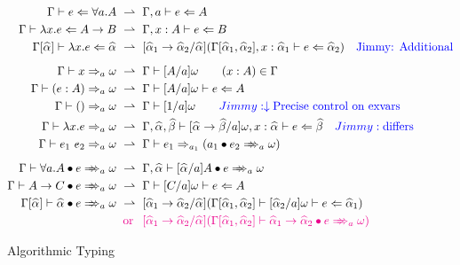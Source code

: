 \begin{figure}[t]
\begin{gather*}
\begin{aligned}
\Gm \vdash e\Lto \forall a. A &\rto \Gm,a \vdash e\Lto A\\
\Gm \vdash \lambda x. e \Lto A\to B &\rto \Gm, x:A  \vdash e \Lto B\\
\Gm[\al] \vdash \lambda x. e \Lto \al &\rto [\al[1]\to \al[2] / \al](\Gm[\al[1],\al[2]], x:\al[1] \vdash e \Lto \al[2]) \quad\text{\jimmy{Additional}}
\\[2mm]
\Gm \vdash x\To_a \jg &\rto \Gm \vdash [A/a] \jg \qquad (x:A)\in \Gm\\
\Gm \vdash (e:A)\To_a \jg &\rto \Gm \vdash [A/a]\jg \vdash e \Lto A\\
\Gm \vdash ()\To_a \jg &\rto \Gm \vdash [1/a]\jg \qquad\jimmy{\downarrow\text{Precise control on exvars}}\\
\Gm \vdash \lambda x. e \To_a \jg &\rto
	\Gm,\al,\bt \vdash [\al\to\bt/a]\jg, x:\al \vdash e\Lto \bt \quad\jimmy{\text{differs}}\\
\Gm \vdash e_1\ e_2 \To_a \jg &\rto \Gm \vdash e_1\To_{a_1} (\appInfAlg{a_1}{e_2})
\\[2mm]
\Gm \vdash \appInfAlg{\forall a. A}{e} &\rto \Gm,\al \vdash \appInfAlg{[\al/a]A}{e}\\
\Gm \vdash \appInfAlg{A\to C}{e} &\rto \Gm \vdash [C/a]\jg \vdash e \Lto A\\
\Gm[\al] \vdash \appInfAlg{\al}{e} &\rto
	[\al[1]\to\al[2]/\al](\Gm[\al[1], \al[2]] \vdash [\al[2]/a]\jg \vdash e\Lto \al[1])\\
 &\color{magenta} \makebox[0pt]{\qquad or}\phantom{{}\rto{}}
 	[\al[1]\to\al[2]/\al](\Gm[\al[1], \al[2]] \vdash \appInfAlg{\al[1]\to\al[2]}{e})
\end{aligned}
\end{gather*}
\caption{Algorithmic Typing}\label{fig:alg}
\end{figure}



